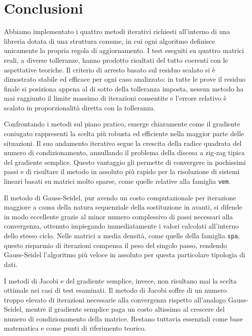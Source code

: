 \documentclass[11pt,a4paper]{article}
\begin{document}
\section{Conclusioni}\label{sec:conclusioni}
Abbiamo implementato i quattro metodi iterativi richiesti all'interno di una libreria dotata di una struttura comune, in cui ogni algoritmo definisce unicamente la propria regola di aggiornamento. I test eseguiti su quattro matrici reali, a diverse tolleranze, hanno prodotto risultati del tutto coerenti con le aspettative teoriche. Il criterio di arresto basato sul residuo scalato si è dimostrato stabile ed efficace per ogni caso analizzato: in tutte le prove il residuo finale si posiziona appena al di sotto della tolleranza imposta, nessun metodo ha mai raggiunto il limite massimo di iterazioni consentite e l'errore relativo è scalato in proporzionalità diretta con la tolleranza.

Confrontando i metodi sul piano pratico, emerge chiaramente come il gradiente coniugato rappresenti la scelta più robusta ed efficiente nella maggior parte delle situazioni. Il suo andamento iterativo segue la crescita della radice quadrata del numero di condizionamento, annullando il problema della discesa a zig-zag tipica del gradiente semplice. Questo vantaggio gli permette di convergere in pochissimi passi e di risultare il metodo in assoluto più rapido per la risoluzione di sistemi lineari basati su matrici molto sparse, come quelle relative alla famiglia \texttt{vem}. 

Il metodo di Gauss-Seidel, pur avendo un costo computazionale per iterazione maggiore a causa della natura sequenziale della sostituzione in avanti, si difende in modo eccellente grazie al minor numero complessivo di passi necessari alla convergenza, ottenuto impiegando immediatamente i valori calcolati all'interno dello stesso ciclo. Nelle matrici a media densità, come quelle della famiglia \texttt{spa}, questo risparmio di iterazioni compensa il peso del singolo passo, rendendo Gauss-Seidel l'algoritmo più veloce in assoluto per questa particolare tipologia di dati.

I metodi di Jacobi e del gradiente semplice, invece, non risultano mai la scelta ottimale nei casi di test esaminati. Il metodo di Jacobi soffre di un numero troppo elevato di iterazioni necessarie alla convergenza rispetto all'analogo Gauss-Seidel, mentre il gradiente semplice paga un costo altissimo al crescere del numero di condizionamento della matrice. Restano tuttavia essenziali come base matematica e come punti di riferimento teorico. 
\end{document}
